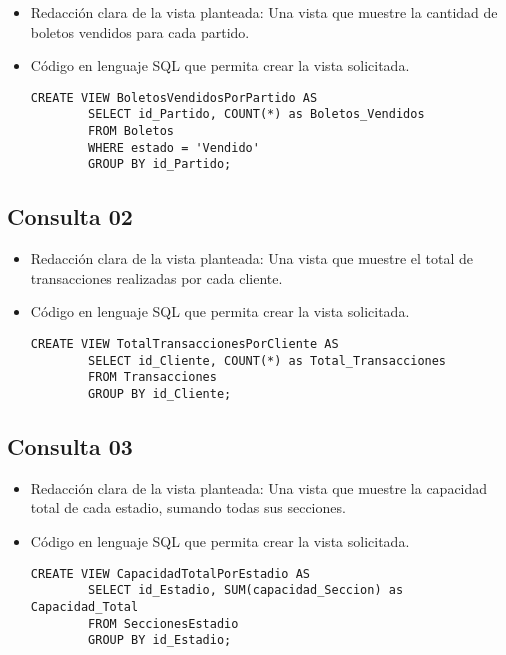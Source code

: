 \begin{itemize}
    \item Redacción clara de la vista planteada: Una vista que muestre la cantidad de boletos vendidos para cada partido.
    \item Código en lenguaje SQL que permita crear la vista solicitada.    
    \begin{lstlisting}[caption={Tablas para la BdDatos}, label={lst:sql_estadios}]
        CREATE VIEW BoletosVendidosPorPartido AS
        SELECT id_Partido, COUNT(*) as Boletos_Vendidos
        FROM Boletos
        WHERE estado = 'Vendido'
        GROUP BY id_Partido;            
    \end{lstlisting}    
    
\end{itemize}

\subsection*{Consulta 02}

\begin{itemize}
    \item Redacción clara de la vista planteada: Una vista que muestre el total de transacciones realizadas por cada cliente.
    \item Código en lenguaje SQL que permita crear la vista solicitada.    
    \begin{lstlisting}[caption={Tablas para la BdDatos}, label={lst:sql_estadios}]
        CREATE VIEW TotalTransaccionesPorCliente AS
        SELECT id_Cliente, COUNT(*) as Total_Transacciones
        FROM Transacciones
        GROUP BY id_Cliente;            
    \end{lstlisting}    
    
\end{itemize}

\subsection*{Consulta 03}

\begin{itemize}
    \item Redacción clara de la vista planteada:  Una vista que muestre la capacidad total de cada estadio, sumando todas sus secciones.
    \item Código en lenguaje SQL que permita crear la vista solicitada.    
    \begin{lstlisting}[caption={Tablas para la BdDatos}, label={lst:sql_estadios}]
        CREATE VIEW CapacidadTotalPorEstadio AS
        SELECT id_Estadio, SUM(capacidad_Seccion) as Capacidad_Total
        FROM SeccionesEstadio
        GROUP BY id_Estadio;            
    \end{lstlisting}    
    
\end{itemize}